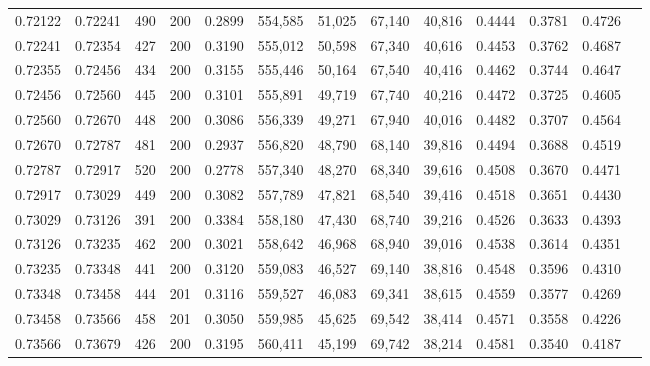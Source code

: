 \begin{tabular}{rrrrrrrrrrrrr}
0.72122 & 0.72241 &    490 & 200 &                                     0.2899 & 554,585 &  51,025 &  67,140 &  40,816 & 0.4444 & 0.3781 & 0.4726 \\
0.72241 & 0.72354 &    427 & 200 &                                     0.3190 & 555,012 &  50,598 &  67,340 &  40,616 & 0.4453 & 0.3762 & 0.4687 \\
0.72355 & 0.72456 &    434 & 200 &                                     0.3155 & 555,446 &  50,164 &  67,540 &  40,416 & 0.4462 & 0.3744 & 0.4647 \\
0.72456 & 0.72560 &    445 & 200 &                                     0.3101 & 555,891 &  49,719 &  67,740 &  40,216 & 0.4472 & 0.3725 & 0.4605 \\
0.72560 & 0.72670 &    448 & 200 &                                     0.3086 & 556,339 &  49,271 &  67,940 &  40,016 & 0.4482 & 0.3707 & 0.4564 \\
0.72670 & 0.72787 &    481 & 200 &                                     0.2937 & 556,820 &  48,790 &  68,140 &  39,816 & 0.4494 & 0.3688 & 0.4519 \\
0.72787 & 0.72917 &    520 & 200 &                                     0.2778 & 557,340 &  48,270 &  68,340 &  39,616 & 0.4508 & 0.3670 & 0.4471 \\
0.72917 & 0.73029 &    449 & 200 &                                     0.3082 & 557,789 &  47,821 &  68,540 &  39,416 & 0.4518 & 0.3651 & 0.4430 \\
0.73029 & 0.73126 &    391 & 200 &                                     0.3384 & 558,180 &  47,430 &  68,740 &  39,216 & 0.4526 & 0.3633 & 0.4393 \\
0.73126 & 0.73235 &    462 & 200 &                                     0.3021 & 558,642 &  46,968 &  68,940 &  39,016 & 0.4538 & 0.3614 & 0.4351 \\
0.73235 & 0.73348 &    441 & 200 &                                     0.3120 & 559,083 &  46,527 &  69,140 &  38,816 & 0.4548 & 0.3596 & 0.4310 \\
0.73348 & 0.73458 &    444 & 201 &                                     0.3116 & 559,527 &  46,083 &  69,341 &  38,615 & 0.4559 & 0.3577 & 0.4269 \\
0.73458 & 0.73566 &    458 & 201 &                                     0.3050 & 559,985 &  45,625 &  69,542 &  38,414 & 0.4571 & 0.3558 & 0.4226 \\
0.73566 & 0.73679 &    426 & 200 &                                     0.3195 & 560,411 &  45,199 &  69,742 &  38,214 & 0.4581 & 0.3540 & 0.4187 \\

\end{tabular}
